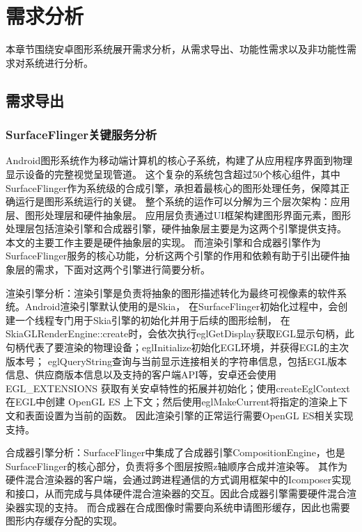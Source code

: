 
\chapter{需求分析}
本章节围绕安卓图形系统展开需求分析，从需求导出、功能性需求以及非功能性需求对系统进行分析。

\section{需求导出}
\subsection{SurfaceFlinger关键服务分析}
Android图形系统作为移动端计算机的核心子系统，构建了从应用程序界面到物理显示设备的完整视觉呈现管道。
这个复杂的系统包含超过50个核心组件，其中SurfaceFlinger作为系统级的合成引擎，承担着最核心的图形处理任务，保障其正确运行是图形系统运行的关键。
整个系统的运作可以分解为三个层次架构：应用层、图形处理层和硬件抽象层。
应用层负责通过UI框架构建图形界面元素，图形处理层包括渲染引擎和合成器引擎，硬件抽象层主要是为这两个引擎提供支持。
本文的主要工作主要是硬件抽象层的实现。
而渲染引擎和合成器引擎作为SurfaceFlinger服务的核心功能，分析这两个引擎的作用和依赖有助于引出硬件抽象层的需求，下面对这两个引擎进行简要分析。

渲染引擎分析：渲染引擎是负责将抽象的图形描述转化为最终可视像素的软件系统。Android渲染引擎默认使用的是Skia，
在SurfaceFlinger初始化过程中，会创建一个线程专门用于Skia引擎的初始化并用于后续的图形绘制，
在SkiaGLRenderEngine::create时，会依次执行eglGetDisplay获取EGL显示句柄，此句柄代表了要渲染的物理设备；eglInitialize初始化EGL环境，并获得EGL的主次版本号；
eglQueryString查询与当前显示连接相关的字符串信息，包括EGL版本信息、供应商版本信息以及支持的客户端API等，安卓还会使用EGL\_EXTENSIONS
获取有关安卓特性的拓展并初始化；使用createEglContext在EGL中创建 OpenGL ES 上下文；然后使用eglMakeCurrent将指定的渲染上下文和表面设置为当前的函数。
因此渲染引擎的正常运行需要OpenGL ES相关实现支持。


合成器引擎分析：SurfaceFlinger中集成了合成器引擎CompositionEngine，也是SurfaceFlinger的核心部分，负责将多个图层按照z轴顺序合成并渲染等。
其作为硬件混合渲染器的客户端，会通过跨进程通信的方式调用框架中的Icomposer实现和接口，从而完成与具体硬件混合渲染器的交互。因此合成器引擎需要硬件混合渲染器实现的支持。
而合成器在合成图像时需要向系统申请图形缓存，因此也需要图形内存缓存分配的实现。

